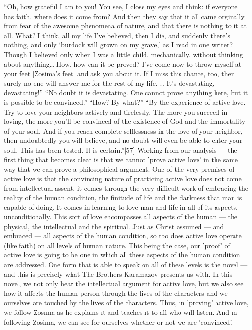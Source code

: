 “Oh, how grateful I am to you! You see, I close my eyes and think: if everyone has faith, where does it come from? And then they say that it all came orginally from fear of the awesome phenomena of nature, and that there is nothing to it at all. What? I think, all my life I’ve believed, then I die, and suddenly there’s nothing, and only ‘burdock will grown on my grave,’ as I read in one writer? Though I believed only when I was a little child, mechanically, without thinking about anything… How, how can it be proved? I’ve come now to throw myself at your feet [Zosima’s feet] and ask you about it. If I miss this chance, too, then surely no one will answer me for the rest of my life. … It’s devastating, devastating!”
“No doubt it is devastating. One cannot prove anything here, but it is possible to be convinced.”
“How? By what?”
“By the experience of active love. Try to love your neighbors actively and tirelessly. The more you succeed in loving, the more you’ll be convinced of the existence of God and the immortality of your soul. And if you reach complete selflessness in the love of your neighbor, then undoubtedly you will believe, and no doubt will even be able to enter your soul. This has been tested. It is certain.”[57]
Working from our analysis — the first thing that becomes clear is that we cannot 'prove active love' in the same way that we can prove a philosophical argument. One of the very premises of active love is that the convincing nature of practicing active love does not come from intellectual assent, it comes through the very difficult work of embracing the reality of the human condition, the finitude of life and the darkness that man is capable of doing. It comes in learning to love man and life in all of its aspects, unconditionally. This sort of love encompasses all aspects of the human — the physical, the intellectual and the spiritual. Just as Christ assumed — and embraced — all aspects of the human condition, so too does active love operate (like faith) on all levels of human nature. This being the case, our 'proof' of active love is going to be one in which all these aspects of the human condition are addressed. 
One form that is able to speak on all of these levels is the novel — and this is precisely what The Brothers Karamazov presents us with. In this novel, we not only hear the intellectual argument for active love, but we also see how it affects the human person through the lives of the characters and we ourselves are touched by the lives of the characters. Thus, in 'proving' active love, we follow Zosima as he explains it and teaches it to all who will listen. And in following Zosima, we can see for ourselves whether or not we are 'convinced'.
